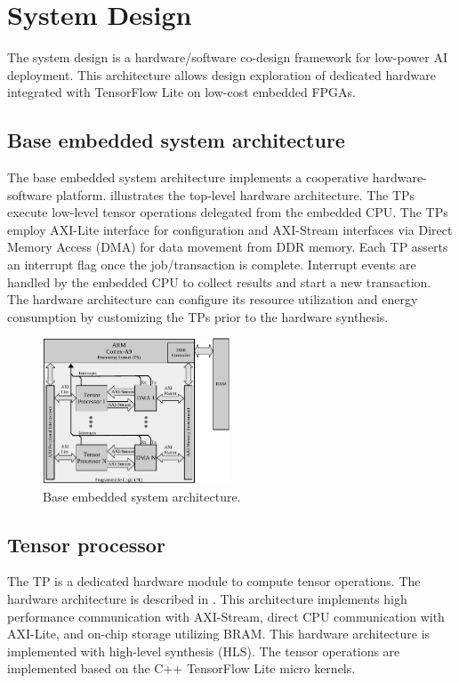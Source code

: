 \section{System Design}
\label{sec:system_design}
The system design is a hardware/software co-design framework for low-power AI deployment. This architecture allows design exploration of dedicated hardware integrated with TensorFlow Lite on low-cost embedded FPGAs.

\subsection{Base embedded system architecture}
The base embedded system architecture implements a cooperative hardware-software platform.  illustrates the top-level hardware architecture. The TPs execute low-level tensor operations delegated from the embedded CPU. The TPs employ AXI-Lite interface for configuration and AXI-Stream interfaces via Direct Memory Access (DMA) for data movement from DDR memory. Each TP asserts an interrupt flag once the job/transaction is complete. Interrupt events are handled by the embedded CPU to collect results and start a new transaction. The hardware architecture can configure its resource utilization and energy consumption by customizing the TPs prior to the hardware synthesis.
\begin{figure}[t!]
	\centering
	\includegraphics[width=0.5\textwidth]{../figures/system_design.pdf}
	\caption{Base embedded system architecture.}
	\label{fig:system_architecture}
\end{figure}
\subsection{Tensor processor}
The TP is a dedicated hardware module to compute tensor operations. The hardware architecture is described in . This architecture implements high performance communication with AXI-Stream, direct CPU communication with AXI-Lite, and on-chip storage utilizing BRAM. This hardware architecture is implemented with high-level synthesis (HLS). The tensor operations are implemented based on the C++ TensorFlow Lite micro kernels.

